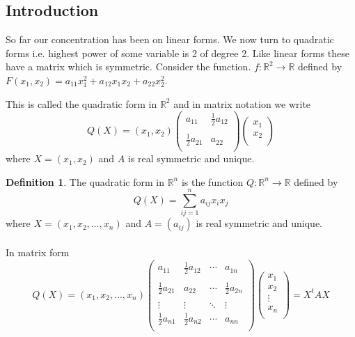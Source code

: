 \documentclass[11pt,a4paper]{article}
\theoremstyle{definition}
\newtheorem{defn}[thm]{Definition}
\begin{document}
\subsection{Introduction}
So far our concentration has been on linear forms. We now turn to quadratic forms i.e. highest power of some variable is 2 of degree 2. Like linear forms these have a matrix which is symmetric. Consider the function. $f:\mathbb{R}^2\longrightarrow \mathbb{R}$ defined by $F(x_1,x_2)=a_{11}x_1^2+a_{12}x_1x_2+a_{22}x^2_2$.

This is called the quadratic form in $\mathbb{R}^2$ and in matrix notation we write
$$Q(X)=(x_1,x_2)
\begin{pmatrix}
a_{11}&\frac{1}{2}a_{12}\\\\ \frac{1}{2}a_{21}&a_{22}\\
\end{pmatrix}
\begin{pmatrix}
x_1\\x_2\\
\end{pmatrix}
$$ where $X=(x_1,x_2)$ and $A$ is real symmetric and unique.\\


\begin{defn}
The quadratic form in $\mathbb{R}^n$ is the function $Q:\mathbb{R}^n\longrightarrow \mathbb{R}$ defined by $$Q(X)=\sum^n_{ij=1}a_{ij}x_ix_j$$ where $X=(x_1,x_2,\dots,x_n)$ and $A=(a_{ij})$ is real symmetric and unique.\\\\
In matrix form $$
Q(X)=(x_1,x_2,\dots,x_n)
\begin{pmatrix}
a_{11}&\frac{1}{2}a_{12}&\cdots&a_{1n}\\\\
\frac{1}{2}a_{21}&a_{22}&\cdots&\frac{1}{2}a_{2n}\\\\
\vdots&\vdots&\ddots&\vdots\\
\frac{1}{2}a_{n1}&\frac{1}{2}a_{n2}&\cdots&a_{nn}\\
\end{pmatrix}
\begin{pmatrix}
x_1\\x_2\\\vdots\\x_n\\
\end{pmatrix}
=X^tAX
$$
\end{defn}
\end{document}
